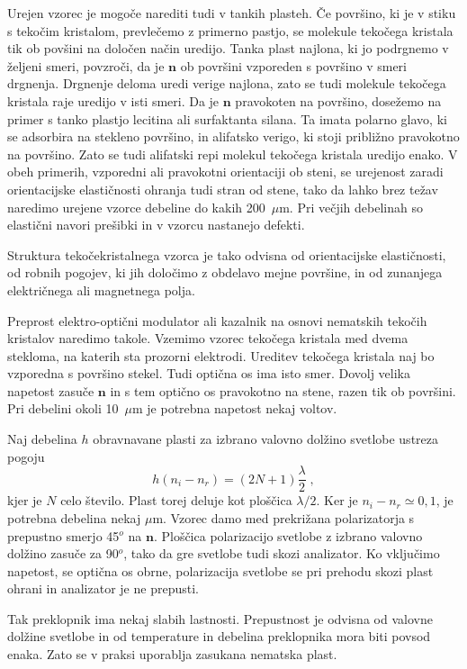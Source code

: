 Urejen vzorec je mogoče narediti tudi v tankih plasteh. Če površino,
ki je v stiku s tekočim kristalom, prevlečemo z primerno pastjo, se
molekule tekočega kristala tik ob povšini na določen način uredijo.
Tanka plast najlona, ki jo podrgnemo v željeni smeri, povzroči, da
je $\mathbf{n}$ ob površini vzporeden s površino v smeri drgnenja. Drgnenje
deloma uredi verige najlona, zato se tudi molekule tekočega kristala
raje uredijo v isti smeri. Da je $\mathbf{n}$ pravokoten na površino,
dosežemo na primer s tanko plastjo lecitina ali surfaktanta silana. 
Ta imata polarno glavo, ki se adsorbira na stekleno površino, in alifatsko verigo, 
ki stoji približno pravokotno na površino. Zato se tudi alifatski repi molekul
tekočega kristala uredijo enako. V obeh primerih, vzporedni ali pravokotni
orientaciji ob steni, se urejenost zaradi orientacijske elastičnosti
ohranja tudi stran od stene, tako da lahko brez težav naredimo urejene
vzorce debeline do kakih 200~$\mu$m. Pri večjih debelinah so elastični
navori prešibki in v vzorcu nastanejo defekti.

Struktura tekočekristalnega vzorca je tako odvisna od orientacijske
elastičnosti, od robnih pogojev, ki jih določimo z obdelavo mejne
površine, in od zunanjega električnega ali magnetnega polja.

Preprost elektro-optični modulator ali kazalnik na osnovi nematskih
tekočih kristalov naredimo takole. Vzemimo vzorec tekočega kristala
med dvema stekloma, na katerih sta prozorni elektrodi. Ureditev tekočega
kristala naj bo vzporedna s površino stekel. Tudi optična os ima isto
smer. Dovolj velika napetost zasuče $\mathbf{n}$ in s tem optično os
pravokotno na stene, razen tik ob površini. Pri debelini okoli 10~$\mu$m
je potrebna napetost nekaj voltov.

Naj debelina $h$ obravnavane plasti za izbrano valovno dolžino svetlobe
ustreza pogoju 
\begin{equation}
h(n_{i}-n_{r})=(2N+1)\frac{\lambda}{2}\;,\label{7.57}
\end{equation}
 kjer je $N$ celo število. Plast torej deluje kot ploščica $\lambda/2$.
Ker je $n_{i}-n_{r}\simeq0,1$, je potrebna debelina nekaj $\mu$m.
Vzorec damo med prekrižana polarizatorja s prepustno smerjo 45$^{o}$
na $\mathbf{n}$. Ploščica polarizacijo svetlobe z izbrano valovno dolžino
zasuče za 90$^{o}$, tako da gre svetlobe tudi skozi analizator. Ko
vključimo napetost, se optična os obrne, polarizacija svetlobe se
pri prehodu skozi plast ohrani in analizator je ne prepusti.

Tak preklopnik ima nekaj slabih lastnosti. Prepustnost je odvisna
od valovne dolžine svetlobe in od temperature in debelina preklopnika
mora biti povsod enaka. Zato se v praksi uporablja zasukana nematska
plast.

